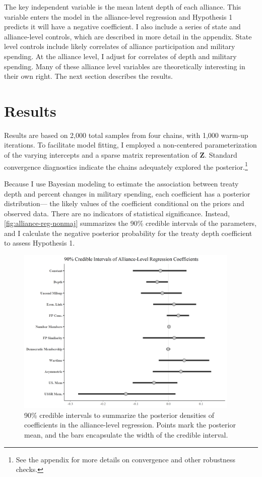 \documentclass[12pt]{article}
\begin{document}
The key independent variable is the mean latent depth of each alliance. 
This variable enters the model in the alliance-level regression and Hypothesis 1 predicts it will have a negative coefficient. 
I also include a series of state and alliance-level controls, which are described in more detail in the appendix.
State level controls include likely correlates of alliance participation and military spending. 
At the alliance level, I adjust for correlates of depth and military spending. 
Many of these alliance level variables are theoretically interesting in their own right.  
The next section describes the results.

 

\section{Results}


Results are based on 2,000 total samples from four chains, with 1,000 warm-up iterations. 
To facilitate model fitting, I employed a non-centered parameterization of the varying intercepts and a sparse matrix representation of \textbf{Z}. 
Standard convergence diagnostics indicate the chains adequately explored the posterior.\footnote{See the appendix for more details on convergence and other robustness checks.} 


Because I use Bayesian modeling to estimate the association between treaty depth and percent changes in military spending, each coefficient has a posterior distribution--- the likely values of the coefficient conditional on the priors and observed data.
There are no indicators of statistical significance. 
Instead, \autoref{fig:alliance-reg-nonmaj} summarizes the 90\% credible intervals of the parameters, and I calculate the negative posterior probability for the treaty depth coefficient to assess Hypothesis 1.


\begin{figure}[htbp]
	\centering
		\includegraphics[width=0.95\textwidth]{../figures/alliance-reg-nonmaj.png}
	\caption{90\% credible intervals to summarize the posterior densities of coefficients in the alliance-level regression. Points mark the posterior mean, and the bars encapsulate the width of the credible interval.}
	\label{fig:alliance-reg-nonmaj}
\end{figure}
\end{document}
